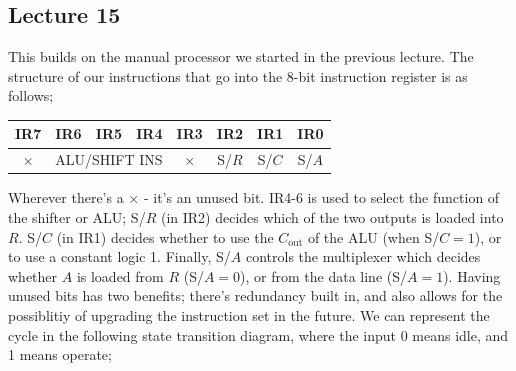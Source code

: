 \documentclass[a4paper, 12pt]{article}
\begin{document}
        \subsection*{Lecture 15}
            This builds on the manual processor we started in the previous lecture. The structure of our instructions that go into the 8-bit instruction register is as follows;
            \begin{center}
                \begin{tabular}{c|c|c|c|c|c|c|c}
                    IR7 & IR6 & IR5 & IR4 & IR3 & IR2 & IR1 &IR0 \\
                    \hline
                    $\times$ & \multicolumn{3}{c|}{ALU/SHIFT INS} & $\times$ & S/$R$ & S/$C$ & S/$A$
                \end{tabular}
            \end{center}
            Wherever there's a $\times$ - it's an unused bit. IR4-6 is used to select the function of the shifter or ALU; S/$R$ (in IR2) decides which of the two outputs is loaded into $R$. S/$C$ (in IR1) decides whether to use the $C_\text{out}$ of the ALU (when S/$C = 1$), or to use a constant logic 1. Finally, S/$A$ controls the multiplexer which decides whether $A$ is loaded from $R$ (S/$A = 0$), or from the data line (S/$A = 1$). Having unused bits has two benefits; there's redundancy built in, and also allows for the possiblitiy of upgrading the instruction set in the future. We can represent the cycle in the following state transition diagram, where the input 0 means idle, and 1 means operate;
            \begin{center}
            \end{center}
\end{document}
